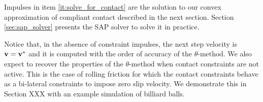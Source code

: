 Impulses in item \ref{it:solve_for_contact} are the solution to our convex
approximation of compliant contact described in the next section. Section
\ref{sec:sap_solver} presents the SAP solver to solve it in practice.


Notice that, in the absence of constraint impulses, the next step velocity is
${\mathbf{v}}={\mathbf{v}}^*$ and it is computed with the order of accuracy of the
$\theta\text{-method}$. We also expect to recover the properties of the
$\theta\text{-method}$ when contact constraints are not active. This is the case
of rolling friction for which the contact constraints behave as a bi-lateral
constraints to impose zero slip velocity. We demonstrate this in Section XXX
with an example simulation of billiard balls.  
